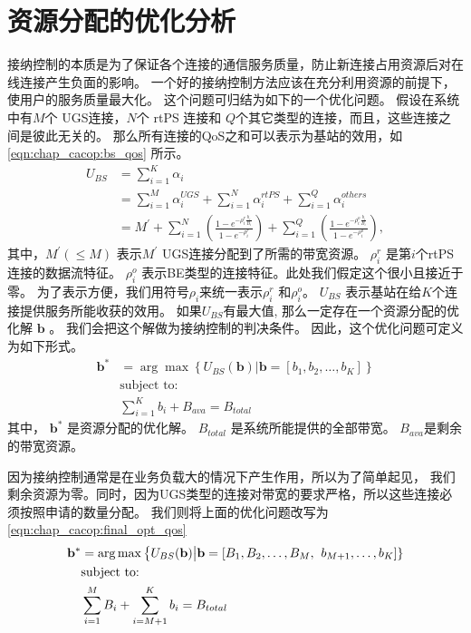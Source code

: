 \section{资源分配的优化分析}
接纳控制的本质是为了保证各个连接的通信服务质量，防止新连接占用资源后对在线连接产生负面的影响。
一个好的接纳控制方法应该在充分利用资源的前提下，使用户的服务质量最大化。
这个问题可归结为如下的一个优化问题。
假设在系统中有$M$个 UGS连接，$N$个 rtPS 连接和 $Q$个其它类型的连接，而且，这些连接之间是彼此无关的。
那么所有连接的QoS之和可以表示为基站的效用，如\eqref{eqn:chap_cacop:bs_qos} 所示。
\begin{align}
U_{BS} &= \displaystyle \sum_{i=1}^K \alpha_i \nonumber \\
&= \sum_{i=1}^M\alpha_i^{UGS} + \sum_{i=1}^N\alpha_i^{rtPS} + \sum_{i=1}^Q\alpha_i^{others} \nonumber \\
&=\displaystyle M^\prime + \sum_{i=1}^N \left( \frac{1- e^{-\rho_i^r
\frac{b_i}{B_i} }}{1-e^{-\rho_i^r}} \right)
 + \sum_{i=1}^Q \left( \frac{1- e^{-\rho_i^o
\frac{b_i}{B_i} }}{1-e^{-\rho_i^o}} \right),
\label{eqn:chap_cacop:bs_qos}
\end{align}
其中，$M^\prime(\le M)$ 表示$M^\prime$ UGS连接分配到了所需的带宽资源。
$\rho_i^r$ 是第$i$个rtPS连接的数据流特征。 
$\rho_i^o$ 表示BE类型的连接特征。此处我们假定这个很小且接近于零。
为了表示方便，我们用符号$\rho_i$来统一表示$\rho_i^r$ 和$\rho_i^o$。
$U_{BS}$ 表示基站在给$K$个连接提供服务所能收获的效用。
如果$U_{BS}$有最大值, 那么一定存在一个资源分配的优化解
$\mathbf{b}$ 。
我们会把这个解做为接纳控制的判决条件。
因此，这个优化问题可定义为如下形式。
\begin{align}
\mathbf{b}^* &= \arg \max \left\{ U_{BS}(\mathbf{b}) \big| \mathbf{b} = [b_1, b_2, \dots, b_K] \right\} \label{eqn_u_bs_qos}\\
&\text{subject to:}\nonumber\\
&\displaystyle\sum_{i=1}^{K}b_i + B_{ava}= B_{total} \nonumber
\end{align}
其中， $\mathbf{b}^*$ 是资源分配的优化解。
$B_{total}$ 是系统所能提供的全部带宽。
$ B_{ava} $是剩余的带宽资源。

因为接纳控制通常是在业务负载大的情况下产生作用，所以为了简单起见，
我们剩余资源为零。同时，因为UGS类型的连接对带宽的要求严格，所以这些连接必须按照申请的数量分配。
我们则将上面的优化问题改写为 \eqref{eqn:chap_cacop:final_opt_qos}
\begin{align}{}
\label{eqn:chap_cacop:final_opt_qos}
\mathbf{b}^* &= \arg \max \left\{ U_{BS}(\mathbf{b}) \big| \mathbf{b} = [B_1, B_2, \dots,B_M,\right.
 \left. b_{M+1}, \ldots, b_K] \right\} \\
&\text{subject to:}\notag \\
&\sum_{i=1}^M B_i + \sum_{i=M+1}^{K}b_i= B_{total} \notag
\end{align}

